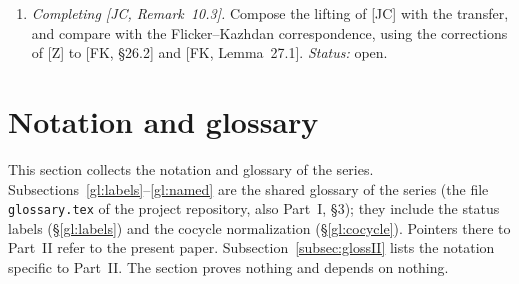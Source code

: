 \documentclass[12pt]{article}
\theoremstyle{plain}
\theoremstyle{definition}
\begin{document}
\begin{enumerate}[label=(\roman*),start=2]
\item \emph{Completing [JC, Remark~10.3].} Compose the lifting of [JC] with the transfer, and compare with the Flicker--Kazhdan correspondence, using the corrections of [Z] to [FK, \S26.2] and [FK, Lemma~27.1]. \emph{Status:} open.
\end{enumerate}

\section{Notation and glossary}\label{sec:glossary}
This section collects the notation and glossary of the series. Subsections~\ref{gl:labels}--\ref{gl:named} are the shared glossary of the series (the file \texttt{glossary.tex} of the project repository, also Part~I, \S3); they include the status labels (\S\ref{gl:labels}) and the cocycle normalization (\S\ref{gl:cocycle}). Pointers there to Part~II refer to the present paper. Subsection~\ref{subsec:glossII} lists the notation specific to Part~II. The section proves nothing and depends on nothing.


\end{document}
